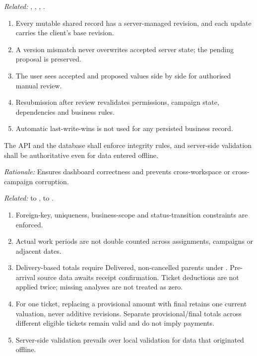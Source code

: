 \textit{Related:} \hyperref[fr:008]{}, \hyperref[fr:036]{}, \hyperref[fr:037]{}, \hyperref[fr:043]{}.
\begin{enumerate}[label=(\alph*),leftmargin=*,itemsep=1pt,topsep=3pt]
\item Every mutable shared record has a server-managed revision, and each update carries the client's base revision.
\item A version mismatch never overwrites accepted server state; the pending proposal is preserved.
\item The user sees accepted and proposed values side by side for authorised manual review.
\item Resubmission after review revalidates permissions, campaign state, dependencies and business rules.
\item Automatic last-write-wins is not used for any persisted business record.
\end{enumerate}

\label{nfr:REL-03}
The API and the database shall enforce integrity rules, and server-side validation shall be authoritative even for data entered offline.

\textit{Rationale:} Ensures dashboard correctness and prevents cross-workspace or cross-campaign corruption.

\textit{Related:} \hyperref[fr:026]{} to \hyperref[fr:037]{}, \hyperref[fr:046]{} to \hyperref[fr:062]{}.
\begin{enumerate}[label=(\alph*),leftmargin=*,itemsep=1pt,topsep=3pt]
\item Foreign-key, uniqueness, business-scope and status-transition constraints are enforced.
\item Actual work periods are not double counted across assignments, campaigns or adjacent dates.
\item Delivery-based totals require Delivered, non-cancelled parents under \hyperref[br:038]{}. Pre-arrival source data awaits receipt confirmation. Ticket deductions are not applied twice; missing analyses are not treated as zero.
\item For one ticket, replacing a provisional amount with final retains one current valuation, never additive revisions. Separate provisional/final totals across different eligible tickets remain valid and do not imply payments.
\item Server-side validation prevails over local validation for data that originated offline.
\end{enumerate}


